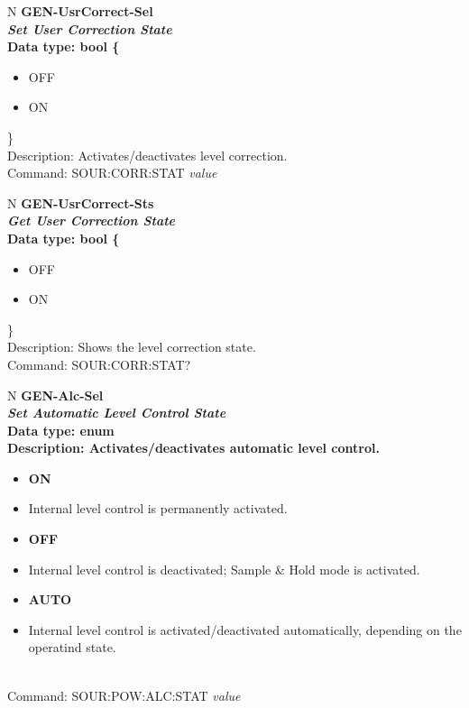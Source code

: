 \documentclass[openany]{article}
\begin{document}
%
		\begin{tabular}{N}
			\hline
			\bfseries GEN-UsrCorrect-Sel \\ \hline
			\emph{Set User Correction State} \\
			Data type: bool \{\begin{itemize}[noitemsep]
				\small
				\item[] OFF
				\item[] ON
			\end{itemize}\} \\
			Description: Activates/deactivates level correction. \\
			Command: SOUR:CORR:STAT \emph{value} \\

		\end{tabular}


		\begin{tabular}{N}
			\hline
			\bfseries GEN-UsrCorrect-Sts \\ \hline
			\emph{Get User Correction State} \\
			Data type: bool \{\begin{itemize}[noitemsep]
				\small
				\item[] OFF
				\item[] ON
			\end{itemize}\} \\
			Description: Shows the level correction state. \\
			Command: SOUR:CORR:STAT? \\

		\end{tabular}
%
		\begin{tabular}{N}
			\hline
			\bfseries GEN-Alc-Sel \\ \hline
			\emph{Set Automatic Level Control State} \\
			Data type: enum \\
			Description: Activates/deactivates automatic level control. \begin{itemize}[noitemsep]
				\small
				\item[] \textbf{ON}
				\item[] Internal level control is permanently activated.
				\item[] \textbf{OFF}
				\item[] Internal level control is deactivated; Sample & Hold mode is activated.
				\item[] \textbf{AUTO}
				\item[] Internal level control is activated/deactivated automatically, depending on the operatind state.
			\end{itemize} \\
			Command: SOUR:POW:ALC:STAT \emph{value} \\

		\end{tabular}
\end{document}
